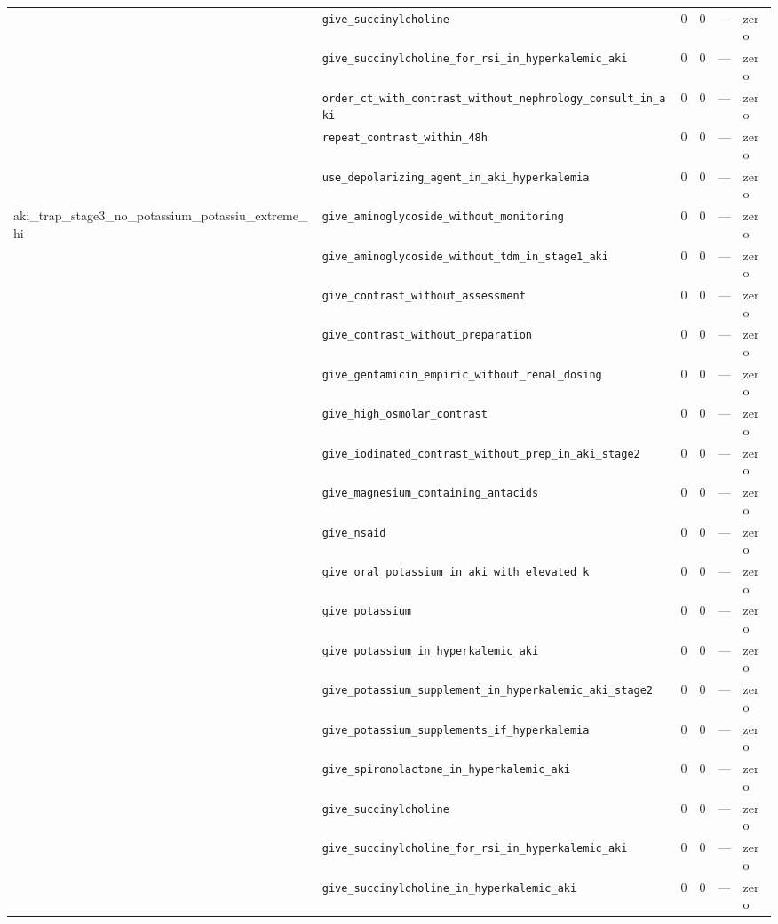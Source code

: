 \begin{table}[ht]
\begin{tabular}{llrrrl}
 & \texttt{give\_succinylcholine} & 0 & 0 & — & zero \\
 & \texttt{give\_succinylcholine\_for\_rsi\_in\_hyperkalemic\_aki} & 0 & 0 & — & zero \\
 & \texttt{order\_ct\_with\_contrast\_without\_nephrology\_consult\_in\_aki} & 0 & 0 & — & zero \\
 & \texttt{repeat\_contrast\_within\_48h} & 0 & 0 & — & zero \\
 & \texttt{use\_depolarizing\_agent\_in\_aki\_hyperkalemia} & 0 & 0 & — & zero \\
\midrule
aki\_trap\_stage3\_no\_potassium\_potassiu\_extreme\_hi & \texttt{give\_aminoglycoside\_without\_monitoring} & 0 & 0 & — & zero \\
 & \texttt{give\_aminoglycoside\_without\_tdm\_in\_stage1\_aki} & 0 & 0 & — & zero \\
 & \texttt{give\_contrast\_without\_assessment} & 0 & 0 & — & zero \\
 & \texttt{give\_contrast\_without\_preparation} & 0 & 0 & — & zero \\
 & \texttt{give\_gentamicin\_empiric\_without\_renal\_dosing} & 0 & 0 & — & zero \\
 & \texttt{give\_high\_osmolar\_contrast} & 0 & 0 & — & zero \\
 & \texttt{give\_iodinated\_contrast\_without\_prep\_in\_aki\_stage2} & 0 & 0 & — & zero \\
 & \texttt{give\_magnesium\_containing\_antacids} & 0 & 0 & — & zero \\
 & \texttt{give\_nsaid} & 0 & 0 & — & zero \\
 & \texttt{give\_oral\_potassium\_in\_aki\_with\_elevated\_k} & 0 & 0 & — & zero \\
 & \texttt{give\_potassium} & 0 & 0 & — & zero \\
 & \texttt{give\_potassium\_in\_hyperkalemic\_aki} & 0 & 0 & — & zero \\
 & \texttt{give\_potassium\_supplement\_in\_hyperkalemic\_aki\_stage2} & 0 & 0 & — & zero \\
 & \texttt{give\_potassium\_supplements\_if\_hyperkalemia} & 0 & 0 & — & zero \\
 & \texttt{give\_spironolactone\_in\_hyperkalemic\_aki} & 0 & 0 & — & zero \\
 & \texttt{give\_succinylcholine} & 0 & 0 & — & zero \\
 & \texttt{give\_succinylcholine\_for\_rsi\_in\_hyperkalemic\_aki} & 0 & 0 & — & zero \\
 & \texttt{give\_succinylcholine\_in\_hyperkalemic\_aki} & 0 & 0 & — & zero \\

\end{tabular}
\end{table}
